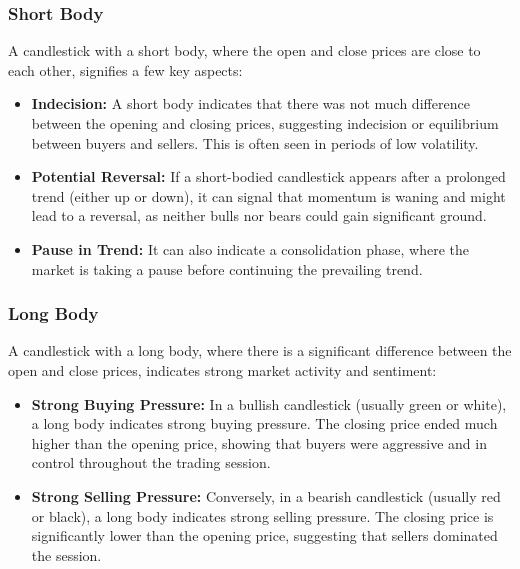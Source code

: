 \documentclass{report}
\begin{document}
     \subsubsection{Short Body}
     \bigbreak \noindent 
     A candlestick with a short body, where the open and close prices are close to each other, signifies a few key aspects:
     \begin{itemize}
         \item \textbf{Indecision:} A short body indicates that there was not much difference between the opening and closing prices, suggesting indecision or equilibrium between buyers and sellers. This is often seen in periods of low volatility.
         \item \textbf{Potential Reversal:} If a short-bodied candlestick appears after a prolonged trend (either up or down), it can signal that momentum is waning and might lead to a reversal, as neither bulls nor bears could gain significant ground.
         \item \textbf{Pause in Trend:} It can also indicate a consolidation phase, where the market is taking a pause before continuing the prevailing trend.
     \end{itemize}

     \bigbreak \noindent 
     \subsubsection{Long Body}
     \bigbreak \noindent 
     A candlestick with a long body, where there is a significant difference between the open and close prices, indicates strong market activity and sentiment:
     \begin{itemize}
         \item \textbf{Strong Buying Pressure:} In a bullish candlestick (usually green or white), a long body indicates strong buying pressure. The closing price ended much higher than the opening price, showing that buyers were aggressive and in control throughout the trading session.
         \item \textbf{Strong Selling Pressure:} Conversely, in a bearish candlestick (usually red or black), a long body indicates strong selling pressure. The closing price is significantly lower than the opening price, suggesting that sellers dominated the session.
     \end{itemize}

     \bigbreak \noindent 
\end{document}
